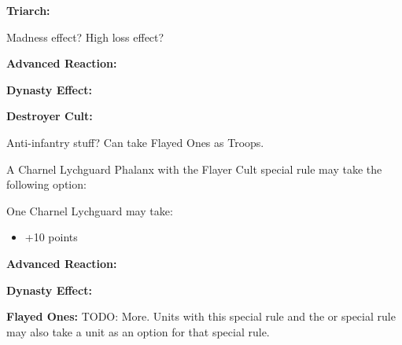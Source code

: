 \textbf{Triarch:}


\newpage
{}

Madness effect? High loss effect?

\textbf{Advanced Reaction:}

\textbf{Dynasty Effect:}

\textbf{Destroyer Cult:}


\newpage
{}

Anti-infantry stuff?
Can take Flayed Ones as Troops.

A Charnel Lychguard Phalanx with the Flayer Cult special rule may take the following option:

One Charnel Lychguard may take:
\begin{itemize}
	\item {} \dotfill +10 points
\end{itemize} 

\textbf{Advanced Reaction:}

\textbf{Dynasty Effect:}

\textbf{Flayed Ones:} TODO: More. Units with this special rule and the  or  special rule may also take a  unit as an option for that special rule.

